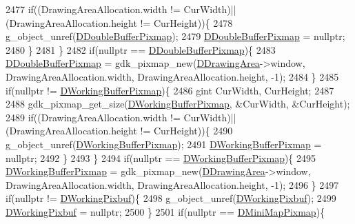 \begin{DoxyCode}
{2477         \textcolor{keywordflow}{if}((DrawingAreaAllocation.width != CurWidth)||(DrawingAreaAllocation.height != CurHeight))\{
2478             g\_object\_unref(\hyperlink{classCApplicationData_aefb64ec5ca3f791f6d431cfc56b9f3b3}{DDoubleBufferPixmap});
2479             \hyperlink{classCApplicationData_aefb64ec5ca3f791f6d431cfc56b9f3b3}{DDoubleBufferPixmap} = \textcolor{keyword}{nullptr};
2480         \}
2481     \}
2482     \textcolor{keywordflow}{if}(\textcolor{keyword}{nullptr} == \hyperlink{classCApplicationData_aefb64ec5ca3f791f6d431cfc56b9f3b3}{DDoubleBufferPixmap})\{
2483         \hyperlink{classCApplicationData_aefb64ec5ca3f791f6d431cfc56b9f3b3}{DDoubleBufferPixmap} = gdk\_pixmap\_new(\hyperlink{classCApplicationData_a4735f5d31632313e0b2a1659eb178987}{DDrawingArea}->window, 
      DrawingAreaAllocation.width, DrawingAreaAllocation.height, -1);
2484     \}
2485     \textcolor{keywordflow}{if}(\textcolor{keyword}{nullptr} != \hyperlink{classCApplicationData_afa34cf2780f38dd28c0c811e69d60a97}{DWorkingBufferPixmap})\{
2486         gint CurWidth, CurHeight;
2487         
2488         gdk\_pixmap\_get\_size(\hyperlink{classCApplicationData_afa34cf2780f38dd28c0c811e69d60a97}{DWorkingBufferPixmap}, &CurWidth, &CurHeight); 
2489         \textcolor{keywordflow}{if}((DrawingAreaAllocation.width != CurWidth)||(DrawingAreaAllocation.height != CurHeight))\{
2490             g\_object\_unref(\hyperlink{classCApplicationData_afa34cf2780f38dd28c0c811e69d60a97}{DWorkingBufferPixmap});
2491             \hyperlink{classCApplicationData_afa34cf2780f38dd28c0c811e69d60a97}{DWorkingBufferPixmap} = \textcolor{keyword}{nullptr};
2492         \}
2493     \}
2494     \textcolor{keywordflow}{if}(\textcolor{keyword}{nullptr} == \hyperlink{classCApplicationData_afa34cf2780f38dd28c0c811e69d60a97}{DWorkingBufferPixmap})\{
2495         \hyperlink{classCApplicationData_afa34cf2780f38dd28c0c811e69d60a97}{DWorkingBufferPixmap} = gdk\_pixmap\_new(\hyperlink{classCApplicationData_a4735f5d31632313e0b2a1659eb178987}{DDrawingArea}->window, 
      DrawingAreaAllocation.width, DrawingAreaAllocation.height, -1);
2496     \}
2497     \textcolor{keywordflow}{if}(\textcolor{keyword}{nullptr} != \hyperlink{classCApplicationData_a19355c8cf25f216019db728219185119}{DWorkingPixbuf})\{
2498         g\_object\_unref(\hyperlink{classCApplicationData_a19355c8cf25f216019db728219185119}{DWorkingPixbuf});
2499         \hyperlink{classCApplicationData_a19355c8cf25f216019db728219185119}{DWorkingPixbuf} = \textcolor{keyword}{nullptr};
2500     \}
2501     \textcolor{keywordflow}{if}(\textcolor{keyword}{nullptr} == \hyperlink{classCApplicationData_abe3af81659ead5113b7b2f165a88e737}{DMiniMapPixmap})\{
}
\end{DoxyCode}
